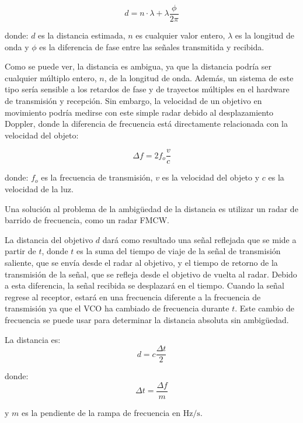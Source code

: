 \begin{equation}
d = n \cdot \lambda + \lambda \frac{\phi}{2 \pi}
\end{equation}

donde: $d$ es la distancia estimada, $n$ es cualquier valor entero, $\lambda$ es la longitud de onda y $\phi$ es la diferencia de fase entre las señales transmitida y recibida. 

Como se puede ver, la distancia es ambigua, ya que la distancia podría ser cualquier múltiplo entero, $n$, de la longitud de onda. 
Además, un sistema de este tipo sería sensible a los retardos de fase y de trayectos múltiples en el hardware de transmisión y recepción. 
Sin embargo, la velocidad de un objetivo en movimiento podría medirse con este simple radar debido al desplazamiento Doppler, donde la diferencia de frecuencia está directamente relacionada con la velocidad del objeto:

\begin{equation}
\Delta f = 2 f_o \frac{v}{c}
\end{equation}

\noindent donde: $f_o$ es la frecuencia de transmisión, $v$ es la velocidad del objeto y $c$ es la velocidad de la luz.

Una solución al problema de la ambigüedad de la distancia es utilizar un radar de barrido de frecuencia, como un radar FMCW. 

La distancia del objetivo $d$ dará como resultado una señal reflejada que se mide a partir de $t$, donde $t$ es la suma del tiempo de viaje de la señal de transmisión saliente, que se envía desde el radar al objetivo, y el tiempo de retorno de la transmisión de la señal, que se refleja desde el objetivo de vuelta al radar. 
Debido a esta diferencia, la señal recibida se desplazará en el tiempo. 
Cuando la señal regrese al receptor, estará en una frecuencia diferente a la frecuencia de transmisión ya que el VCO ha cambiado de frecuencia durante $t$. 
Este cambio de frecuencia se puede usar para determinar la distancia absoluta sin ambigüedad. 

\noindent La distancia es:
\begin{equation}
d = c \frac{\Delta t}{2}
\end{equation}

\noindent donde:
\begin{equation}
\Delta t = \frac{\Delta f}{m}
\end{equation}

\noindent y $m$ es la pendiente de la rampa de frecuencia en $\text{Hz/s}$.

